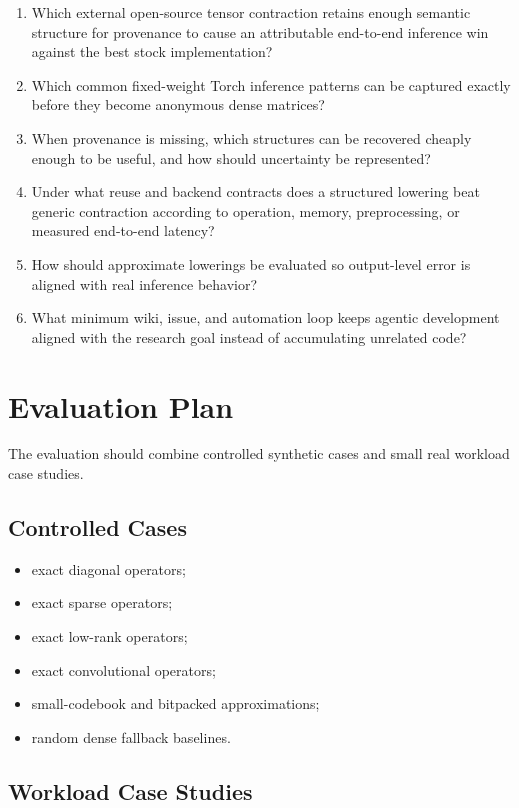 \documentclass[11pt]{article}
\begin{document}
\begin{enumerate}
  \item Which external open-source tensor contraction retains enough semantic
  structure for provenance to cause an attributable end-to-end inference win
  against the best stock implementation?
  \item Which common fixed-weight Torch inference patterns can be captured
  exactly before they become anonymous dense matrices?
  \item When provenance is missing, which structures can be recovered cheaply
  enough to be useful, and how should uncertainty be represented?
  \item Under what reuse and backend contracts does a structured lowering beat
  generic contraction according to operation, memory, preprocessing, or
  measured end-to-end latency?
  \item How should approximate lowerings be evaluated so output-level error is
  aligned with real inference behavior?
  \item What minimum wiki, issue, and automation loop keeps agentic development
  aligned with the research goal instead of accumulating unrelated code?
\end{enumerate}

\section{Evaluation Plan}

The evaluation should combine controlled synthetic cases and small real
workload case studies.

\subsection{Controlled Cases}

\begin{itemize}
  \item exact diagonal operators;
  \item exact sparse operators;
  \item exact low-rank operators;
  \item exact convolutional operators;
  \item small-codebook and bitpacked approximations;
  \item random dense fallback baselines.
\end{itemize}

\subsection{Workload Case Studies}
\end{document}
